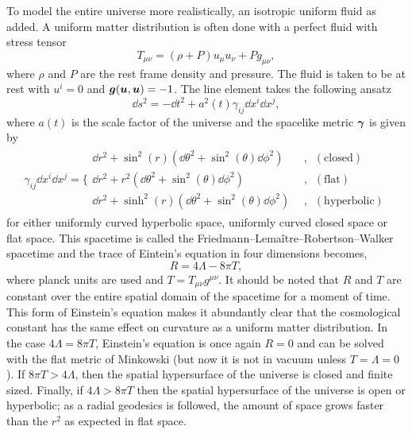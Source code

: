 To model the entire universe more realistically, an isotropic uniform fluid as added. A uniform matter distribution is often done with a perfect fluid with stress tensor
\begin{equation}
T_{\mu\nu} = (\rho+P)u_\mu u_\nu + Pg_{\mu\nu},
\end{equation}
where $\rho$ and $P$ are the rest frame density and pressure. The fluid is taken to be at rest with $u^i =0$ and $\boldsymbol{g}(\boldsymbol{u},\boldsymbol{u})=-1$. The line element takes the following ansatz
\begin{equation}
\dd s^2 = -\dd t^2 + a^2(t) \gamma_{ij} \dd x^i \dd x^j,
\end{equation}
where $a(t)$ is the scale factor of the universe and the spacelike metric $\boldsymbol{\gamma}$ is given by
\begin{align}
\gamma_{ij} \dd x^i \dd x^j = 
\Bigg\{
\begin{array}{ll}
{\dd r^2} + \sin^2(r) \left(\dd \theta^2 + \sin^2(\theta) \dd \phi^2 \right)\quad&, \,\,\,(\mathrm{closed}) \\
\dd r^2 + r^2 \left(\dd \theta^2 + \sin^2(\theta) \dd \phi^2 \right)\,\quad\quad&, \,\,\,(\mathrm{flat}) \\
{\dd r^2} + \sinh^2(r) \left(\dd \theta^2 + \sin^2(\theta) \dd \phi^2 \right)&, \,\,\,(\mathrm{hyperbolic} ) 
\end{array}
\end{align}
for either uniformly curved hyperbolic space, uniformly curved closed space or flat space. This spacetime is called the Friedmann–Lemaître–Robertson–Walker spacetime and the trace of Eintein's equation in four dimensions becomes,
\begin{equation}
R = 4\Lambda -8\pi T,
\end{equation}
where planck units are used and $T=T_{\mu\nu}g^{\mu\nu}$. It should be noted that $R$ and $T$ are constant over the entire spatial domain of the spacetime for a moment of time. This form of Einstein's equation makes it abundantly clear that the cosmological constant has the same effect on curvature as a uniform matter distribution. In the case $4 \Lambda = 8 \pi T$, Einstein's equation is once again $R=0$ and can be solved with the flat metric of Minkowski (but now it is not in vacuum unless $T=\Lambda=0$). If $8\pi T> 4\Lambda$, then the spatial hypersurface of the universe is closed and finite sized. Finally, if $4\Lambda > 8 \pi T$ then the spatial hypersurface of the universe is open or hyperbolic; as a radial geodesics is followed, the amount of space grows faster than the $r^2$ as expected in flat space.

